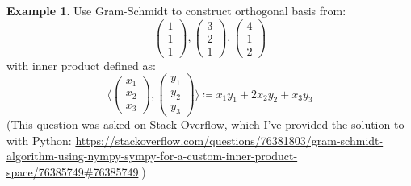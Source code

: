 \documentclass[12pt, a4paper]{article}
\newcommand{\inner}[1]{\langle #1 \rangle}
\theoremstyle{remark}
\theoremstyle{definition}
\newtheorem{example}{Example}
\numberwithin{equation}{section}
\numberwithin{definition}{section}
\numberwithin{example}{section}
\numberwithin{exercise}{section}
\numberwithin{remark}{section}
\numberwithin{figure}{section}
\begin{document}
\begin{example}
    Use Gram-Schmidt to construct orthogonal basis from:
    \begin{equation*}
        \begin{pmatrix}
            1 \\ 1 \\ 1
        \end{pmatrix},
        \begin{pmatrix}
            3 \\ 2 \\ 1
        \end{pmatrix},
        \begin{pmatrix}
            4 \\ 1 \\ 2
        \end{pmatrix}
    \end{equation*}
    with inner product defined as:
    \begin{equation*}
        \inner{
            \begin{pmatrix}
                x_1 \\ x_2 \\ x_3
            \end{pmatrix},
            \begin{pmatrix}
                y_1 \\ y_2 \\ y_3
            \end{pmatrix}
        }
        \coloneqq
        x_1 y_1 + 2 x_2 y_2 + x_3 y_3
    \end{equation*}
    (This question was asked on Stack Overflow, which I've provided the solution to with Python:
    \url{https://stackoverflow.com/questions/76381803/gram-schmidt-algorithm-using-nympy-sympy-for-a-custom-inner-product-space/76385749#76385749}.)
\end{example}
\end{document}

